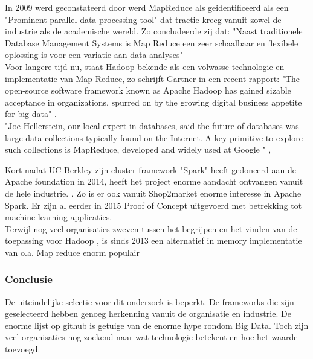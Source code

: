 In 2009 werd geconstateerd door \cite{aarnio2009parallel} werd MapReduce als geidentificeerd als een "Prominent parallel data processing tool" dat tractie kreeg vanuit zowel de industrie als de academische wereld. Zo concludeerde zij dat: "Naast traditionele Database Management Systems is Map Reduce een zeer schaalbaar en flexibele oplossing is voor een variatie aan data analyses" \parencite{aarnio2009parallel} \\

Voor langere tijd nu, staat Hadoop bekende als een volwasse technologie en implementatie van Map Reduce, zo schrijft Gartner in een recent rapport: "The open-source software framework known as Apache Hadoop has gained sizable acceptance in organizations, spurred on by the growing digital business appetite for big data" \parencite{hadoop2013selection}. \\


"Joe Hellerstein, our local expert in databases, said the future of databases was large data
collections typically found on the Internet. A key primitive to explore such collections is
MapReduce, developed and widely used at Google \parencite{dean2008mapreduce}" \parencite{asanovic2006landscape}, 

Kort nadat UC Berkley zijn cluster framework "Spark" heeft gedoneerd aan de Apache foundation in 2014, heeft het project enorme aandacht ontvangen vanuit de hele industrie. \parencite{spark2015intro}. Zo is er ook vanuit Shop2market enorme interesse in Apache Spark. Er zijn al eerder in 2015 Proof of Concept uitgevoerd met betrekking tot machine learning applicaties. \\

Terwijl nog veel organisaties zweven tussen het begrijpen en het vinden van de toepassing voor Hadoop \parencite{hadoop2015adoption}, is sinds 2013 een alternatief in memory implementatie van o.a. Map reduce enorm populair  \parencite{spark2015intro}

\subsubsection{Conclusie}

De uiteindelijke selectie voor dit onderzoek is beperkt. De frameworks die zijn geselecteerd hebben genoeg herkenning vanuit de organisatie en industrie. De enorme lijst op github is getuige van de enorme hype rondom Big Data. Toch zijn veel organisaties nog zoekend naar wat technologie betekent en hoe het waarde toevoegd\parencite{hadoop2015adoption}.

